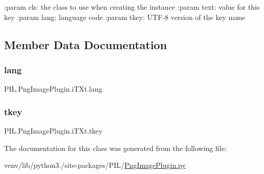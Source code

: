 \begin{DoxyVerb}:param cls: the class to use when creating the instance
:param text: value for this key
:param lang: language code
:param tkey: UTF-8 version of the key name
\end{DoxyVerb}
 

\subsection{Member Data Documentation}
\mbox{\label{classPIL_1_1PngImagePlugin_1_1iTXt_a26a77c7ee5ba643dc915450436608f70}} 
\subsubsection{\texorpdfstring{lang}{lang}}
{\footnotesize\ttfamily P\+I\+L.\+Png\+Image\+Plugin.\+i\+T\+Xt.\+lang}

\mbox{\label{classPIL_1_1PngImagePlugin_1_1iTXt_aefb8b1e34bfb151cded82c8795bac2a8}} 
\subsubsection{\texorpdfstring{tkey}{tkey}}
{\footnotesize\ttfamily P\+I\+L.\+Png\+Image\+Plugin.\+i\+T\+Xt.\+tkey}



The documentation for this class was generated from the following file\+:\begin{DoxyCompactItemize}
\item 
venv/lib/python3./site-\/packages/\+P\+I\+L/\hyperlink{PngImagePlugin_8py}{Png\+Image\+Plugin.\+py}\end{DoxyCompactItemize}
